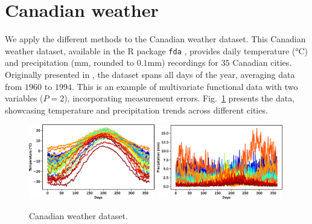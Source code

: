 
\section{Canadian weather} %
\label{sec:canadian_weather}


We apply the different methods to the Canadian weather dataset. This Canadian weather dataset, available in the R package \texttt{fda} \cite{ramsayFdaFunctionalData2023}, provides daily temperature (°C) and precipitation (mm, rounded to $0.1$mm) recordings for $35$ Canadian cities. Originally presented in \cite{ramsayFunctionalDataAnalysis2005}, the dataset spans all days of the year, averaging data from $1960$ to $1994$. This is an example of multivariate functional data with two variables ($P = 2$), incorporating measurement errors. Fig.~\ref{fig:canadian_weather} presents the data, showcasing temperature and precipitation trends across different cities.
\begin{figure}
    \centering
    \includegraphics[width=0.49\textwidth]{figures/temperature.eps}
    \includegraphics[width=0.49\textwidth]{figures/precipitation.eps}
    \caption{Canadian weather dataset.}
    \label{fig:canadian_weather}
\end{figure}

